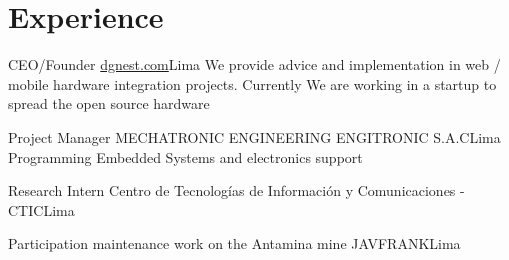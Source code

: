 \section{Experience}

{CEO/Founder}
{\href{http://dgnest.com}{dgnest.com}}{Lima}
{We provide advice and implementation in web / mobile hardware integration projects. Currently We are working in a startup to spread the open source hardware}
{} 

{Project Manager}
{MECHATRONIC ENGINEERING ENGITRONIC S.A.C}{Lima}
{Programming Embedded Systems and electronics support}
{} 

{Research Intern}
{Centro de Tecnologías de Información y Comunicaciones - CTIC}{Lima}
{}
{} 

{Participation maintenance work on the Antamina mine}
{JAVFRANK}{Lima}
{}
{}  
